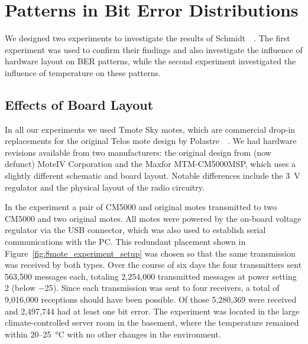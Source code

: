 \section{Patterns in Bit Error Distributions}
\label{sec:bit_error_patterns}

We designed two experiments to investigate the results of Schmidt~\etal~\cite{Schmidt2013}.
The first experiment was used to confirm their findings and also investigate the influence of hardware layout on \ac{BER} patterns, while the second experiment investigated the influence of temperature on these patterns.

\subsection{Effects of Board Layout}
\label{subsec:effects_of_board_layout}

In all our experiments we used Tmote Sky motes, which are commercial drop-in replacements for the original Telos mote design by Polastre~\etal~\cite{Polastre2005}.
We had hardware revisions available from two manufacturers: the original design from (now defunct) MoteIV Corporation and the Maxfor MTM-CM5000MSP, which uses a slightly different schematic and board layout.
Notable differences include the \SI{3}{\volt} regulator and the physical layout of the radio circuitry.

In the experiment a pair of CM5000 and original motes transmitted to two CM5000 and two original motes.
All motes were powered by the on-board voltage regulator via the USB connector, which was also used to establish serial communications with the PC.
This redundant placement shown in Figure~\ref{fig:8mote_experiment_setup} was chosen so that the same transmission was received by both types.
Over the course of six days the four transmitters sent 563,500 messages each, totaling 2,254,000 transmitted messages at power setting 2 (below \SI{-25}{\dBm}).
Since each transmission was sent to four receivers, a total of 9,016,000 receptions should have been possible.
Of those 5,280,369 were received and 2,497,744 had at least one bit error.
The experiment was located in the large climate-controlled server room in the basement, where the temperature remained within $20$--\SI{25}{\celsius} with no other changes in the environment.

